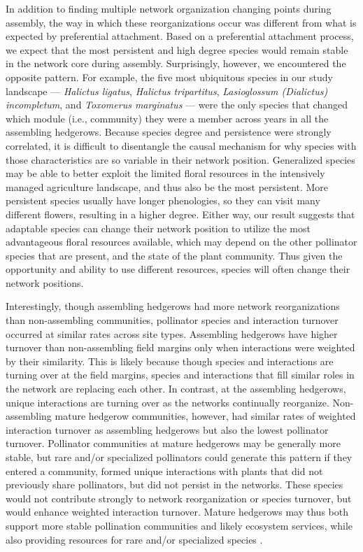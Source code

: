 \documentclass[12pt]{article}
\begin{document}
In addition to finding multiple network organization changing points
during assembly, the way in which these reorganizations occur was
different from what is expected by preferential attachment. Based on a
preferential attachment process, we expect that the most persistent
and high degree species would remain stable in the network core during
assembly. Surprisingly, however, we encountered the opposite
pattern. For example, the five most ubiquitous species in our study
landscape --- \textit{Halictus ligatus}, \textit{Halictus
  tripartitus}, \textit{Lasioglossum (Dialictus) incompletum}, and
\textit{Toxomerus marginatus} --- were the only species that changed
which module (i.e., community) they were a member across years in all
the assembling hedgerows. Because species degree and persistence were
strongly correlated, it is difficult to disentangle the causal
mechanism for why species with those characteristics are so variable
in their network position. Generalized species may be able to better
exploit the limited floral resources in the intensively managed
agriculture landscape, and thus also be the most persistent. More
persistent species usually have longer phenologies, so they can visit
many different flowers, resulting in a higher degree. Either way, our
result suggests that adaptable species can change their network
position to utilize the most advantageous floral resources available,
which may depend on the other pollinator species that are present, and
the state of the plant community. Thus given the opportunity and
ability to use different resources, species will often change their
network positions.

Interestingly, though assembling hedgerows had more network
reorganizations than non-assembling communities, pollinator species
and interaction turnover occurred at similar rates across site types.
Assembling hedgerows have higher turnover than non-assembling field
margins only when interactions were weighted by their similarity. This
is likely because though species and interactions are turning over at
the field margins, species and interactions that fill similar roles in
the network are replacing each other. In contrast, at the assembling
hedgerows, unique interactions are turning over as the networks
continually reorganize. Non-assembling mature hedgerow communities,
however, had similar rates of weighted interaction turnover as
assembling hedgerows but also the lowest pollinator
turnover. Pollinator communities at mature hedgerows may be generally
more stable, but rare and/or specialized pollinators could generate
this pattern if they entered a community, formed unique interactions
with plants that did not previously share pollinators, but did not
persist in the networks. These species would not contribute strongly
to network reorganization or species turnover, but would enhance
weighted interaction turnover. Mature hedgerows may thus both support
more stable pollination communities and likely ecosystem services,
while also providing resources for rare and/or specialized species
\citep{kremen-2015-602, mgonigle-2015-x}.
\end{document}
